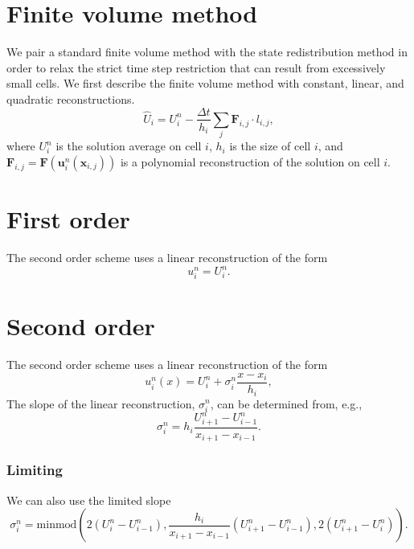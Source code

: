 
\section{Finite volume method}
We pair a standard finite volume method with the state redistribution method in order to relax the strict time step restriction that can result from excessively small cells.  We first describe the finite volume method with constant, linear, and quadratic reconstructions.  
\begin{equation} 
\hat U_i = U^n_i - \frac{\Delta t}{h_i}\sum_{j}\mathbf{F}_{i,j} \cdot l_{i,j},\label{eq:scheme}
\end{equation}
where $U^n_i$ is the solution average on cell $i$, $h_i$ is the size of cell $i$, and $\mathbf{F}_{i,j} = \mathbf{F}(\textbf{u}^n_{i}(\mathbf{x}_{i,j}))$ is a polynomial reconstruction of the solution on cell $i$.
\section{First order}
The second order scheme uses a linear reconstruction of the form
$$
u^n_i = U^n_i.
$$
\section{Second order}
The second order scheme uses a linear reconstruction of the form
	$$
	u^n_i(x) = U^n_{i} + \sigma^n_{i}\frac{x-x_i}{h_i},
	$$
 	The slope of the linear reconstruction, $\sigma^n_{i}$, can be determined from, e.g., 
 	\begin{equation}\label{eq:cd_scheme}
 	    \sigma^n_{i} = h_i\frac{U^n_{i+1} - U^n_{i-1}}{x_{i+1} - x_{i-1}}.
 	\end{equation}
 \subsubsection{Limiting}
We can also use the limited slope
\begin{equation}\label{eq:u_second_order_limiter}
\sigma^n_i = \text{minmod}\left(2(U^n_{i} - U^n_{i-1}), \frac{h_i}{x_{i+1} - x_{i-1}}(U^n_{i+1} - U^n_{i-1}), 2(U^n_{i+1} - U^n_{i})\right).
\end{equation}
